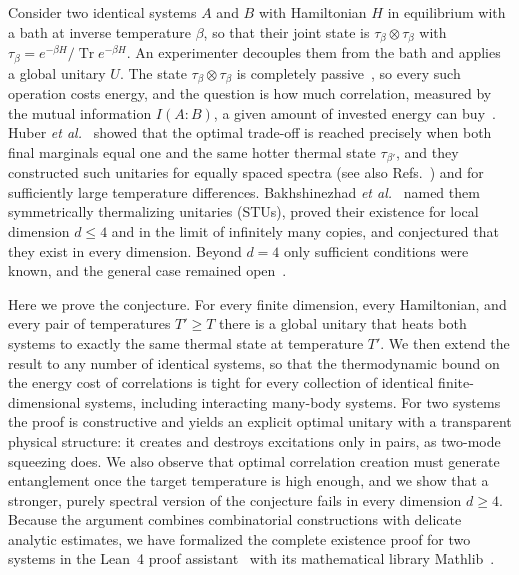 \documentclass[aps,prl,reprint,superscriptaddress,amsmath,amssymb]{revtex4-2}
\newcommand{\Tr}{\operatorname{Tr}}
\begin{document}
Consider two identical systems $A$ and $B$ with Hamiltonian $H$ in equilibrium with a bath at inverse temperature
$\beta$, so that their joint state is $\tau_\beta\otimes\tau_\beta$ with $\tau_\beta=e^{-\beta H}/\Tr e^{-\beta H}$.
An experimenter decouples them from the bath and applies a global unitary $U$. The state
$\tau_\beta\otimes\tau_\beta$ is completely passive~\cite{PuszWoronowicz1978,Lenard1978}, so every such operation
costs energy, and the question is how much correlation, measured by the mutual information $I(A{:}B)$, a given
amount of invested energy can buy~\cite{Huber2015,Bruschi2015}. Huber \textit{et al.}~\cite{Huber2015} showed that the
optimal trade-off is reached precisely when both final marginals equal one and the same hotter thermal state
$\tau_{\beta'}$, and they constructed such unitaries for equally spaced spectra (see also
Refs.~\cite{Jevtic2012,McKay2018}) and for sufficiently large temperature differences. Bakhshinezhad
\textit{et al.}~\cite{Bakhshinezhad2019} named them symmetrically thermalizing unitaries (STUs), proved their
existence for local dimension $d\le4$ and in the limit of infinitely many copies, and conjectured that they exist in
every dimension. Beyond $d=4$ only sufficient conditions were known, and the general case remained
open~\cite{Bakhshinezhad2019,Clivaz2020}.

Here we prove the conjecture. For every finite dimension, every Hamiltonian, and every pair of temperatures $T'\ge T$
there is a global unitary that heats both systems to exactly the same thermal state at temperature $T'$. We then
extend the result to any number of identical systems, so that the thermodynamic bound on the energy cost of
correlations is tight for every collection of identical finite-dimensional systems, including interacting many-body
systems. For two systems the proof is constructive and yields an explicit
optimal unitary with a transparent physical structure: it creates and destroys excitations only in pairs, as two-mode
squeezing does. We also observe that optimal correlation creation must generate entanglement once the target
temperature is high enough, and we show that a stronger, purely spectral version of the conjecture fails in every
dimension $d\ge4$. Because the argument combines combinatorial constructions with delicate analytic estimates, we have
formalized the complete existence proof for two systems in the Lean~4 proof assistant~\cite{Lean2021} with its
mathematical library Mathlib~\cite{Mathlib2020}.
\end{document}

